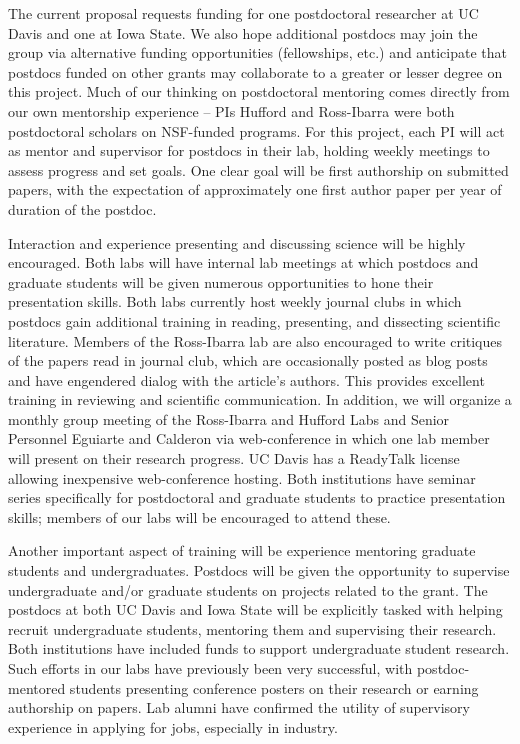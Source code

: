 The current proposal requests funding for one postdoctoral researcher at UC Davis and one at Iowa State. We also hope additional postdocs may join the group via alternative funding opportunities (fellowships, etc.) and anticipate that postdocs funded on other grants may collaborate to a greater or lesser degree on this project.  Much of our thinking on postdoctoral mentoring comes directly from our own mentorship experience -- PIs Hufford and Ross-Ibarra were both postdoctoral scholars on NSF-funded programs. For this project, each PI will act as mentor and supervisor for postdocs in their lab, holding weekly meetings to assess progress and set goals.  One clear goal will be first authorship on submitted papers, with the expectation of approximately one first author paper per year of duration of the postdoc. 

Interaction and experience presenting and discussing science will be highly encouraged. Both labs will have internal lab meetings at which postdocs and graduate students will be given numerous opportunities to hone their presentation skills.  Both labs currently host weekly journal clubs in which postdocs gain additional training in reading, presenting, and dissecting scientific literature. Members of the Ross-Ibarra lab are also encouraged to write critiques of the papers read in journal club, which are occasionally posted as blog posts and have engendered dialog with the article's authors.  This provides excellent training in reviewing and  scientific communication.  
In addition, we will organize a monthly group meeting of the Ross-Ibarra and Hufford Labs and Senior Personnel Eguiarte and Calderon via web-conference in which one lab member will present on their research progress.  UC Davis has a ReadyTalk license allowing inexpensive web-conference hosting. Both institutions have seminar series specifically for postdoctoral and graduate students to practice presentation skills; members of our labs will be encouraged to attend these.

Another important aspect of training will be experience mentoring graduate students and undergraduates.  Postdocs will be given the opportunity to supervise undergraduate and/or graduate students on projects related to the grant. 
The postdocs at both UC Davis and Iowa State will be explicitly tasked with helping recruit undergraduate students, mentoring them and supervising their research. Both institutions have included funds to support undergraduate student research.  Such efforts in our labs have previously been very successful, with postdoc-mentored students presenting conference posters on their research or earning authorship on papers.  Lab alumni have confirmed the utility of supervisory experience in applying for jobs, especially in industry.


